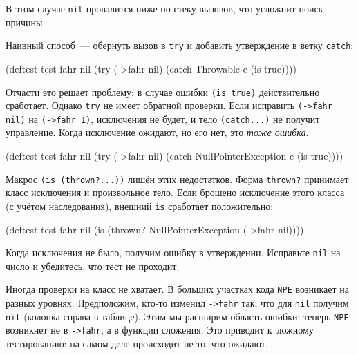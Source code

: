 
\noindent
В этом случае \verb|nil| провалится ниже по стеку вызовов, что усложнит поиск
причины.

Наивный способ~--- обернуть вызов в \verb|try| и добавить утверждение в ветку
\verb|catch|:

\begin{english}
  \begin{clojure}
(deftest test-fahr-nil
  (try
    (->fahr nil)
    (catch Throwable e
      (is true))))
  \end{clojure}
\end{english}

Отчасти это решает проблему: в случае ошибки \verb|(is true)| действительно
сработает. Однако \verb|try| не имеет обратной проверки. Если исправить
\verb|(->fahr nil)| на \verb|(->fahr 1)|, исключения не будет, и тело
\verb|(catch...)| не получит управление. Когда исключение ожидают, но его нет,
это \emph{тоже ошибка}.


\begin{english}
  \begin{clojure}
(deftest test-fahr-nil
  (try
    (->fahr nil)
    (catch NullPointerException e
      (is true))))
  \end{clojure}
\end{english}

Макрос \verb|(is (thrown?...))| лишён этих недостатков. Форма \verb|thrown?|
принимает класс исключения и произвольное тело. Если брошено исключение этого
класса (с учётом наследования), внешний \verb|is| сработает положительно:

\begin{english}
  \begin{clojure}
(deftest test-fahr-nil
  (is (thrown? NullPointerException
               (->fahr nil))))
  \end{clojure}
\end{english}

Когда исключения не было, получим ошибку в утверждении. Исправьте \verb|nil|
на число и убедитесь, что тест не проходит.


Иногда проверки на класс не хватает. В больших участках кода \verb|NPE|
возникает на разных уровнях. Предположим, кто-то изменил \verb|->fahr| так, что
для \verb|nil| получим \verb|nil| (колонка справа в таблице). Этим мы расширим
область ошибки: теперь \verb|NPE| возникнет не в \verb|->fahr|, а в функции
сложения. Это приводит к~ложному тестированию: на самом деле происходит не то,
что ожидают.

